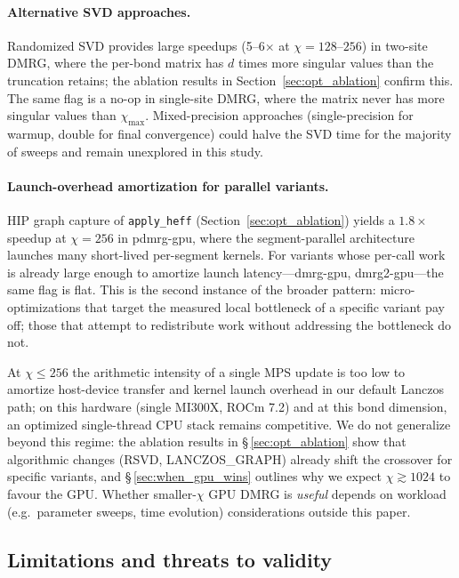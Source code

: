 \documentclass[preprint,12pt]{elsarticle}
\begin{document}
\paragraph{Alternative SVD approaches.}
Randomized SVD \cite{Halko2011} provides large speedups (5--6$\times$ at $\chi = 128$--$256$) in two-site DMRG, where the per-bond matrix has $d$ times more singular values than the truncation retains; the ablation results in Section~\ref{sec:opt_ablation} confirm this.
The same flag is a no-op in single-site DMRG, where the matrix never has more singular values than $\chi_\text{max}$.
Mixed-precision approaches (single-precision for warmup, double for final convergence) could halve the SVD time for the majority of sweeps and remain unexplored in this study.

\paragraph{Launch-overhead amortization for parallel variants.}
HIP graph capture of \texttt{apply\_heff} (Section~\ref{sec:opt_ablation}) yields a $1.8\times$ speedup at $\chi = 256$ in pdmrg-gpu, where the segment-parallel architecture launches many short-lived per-segment kernels.
For variants whose per-call work is already large enough to amortize launch latency---dmrg-gpu, dmrg2-gpu---the same flag is flat.
This is the second instance of the broader pattern: micro-optimizations that target the measured local bottleneck of a specific variant pay off; those that attempt to redistribute work without addressing the bottleneck do not.

At $\chi \leq 256$ the arithmetic intensity of a single MPS update is too low to amortize host-device transfer and kernel launch overhead in our default Lanczos path; on this hardware (single MI300X, ROCm 7.2) and at this bond dimension, an optimized single-thread CPU stack remains competitive. We do not generalize beyond this regime: the ablation results in \S\,\ref{sec:opt_ablation} show that algorithmic changes (RSVD, LANCZOS\_GRAPH) already shift the crossover for specific variants, and \S\,\ref{sec:when_gpu_wins} outlines why we expect $\chi \gtrsim 1024$ to favour the GPU. Whether smaller-$\chi$ GPU DMRG is \emph{useful} depends on workload (e.g.\ parameter sweeps, time evolution) considerations outside this paper.

\subsection{Limitations and threats to validity}
\label{sec:limitations}
\end{document}

